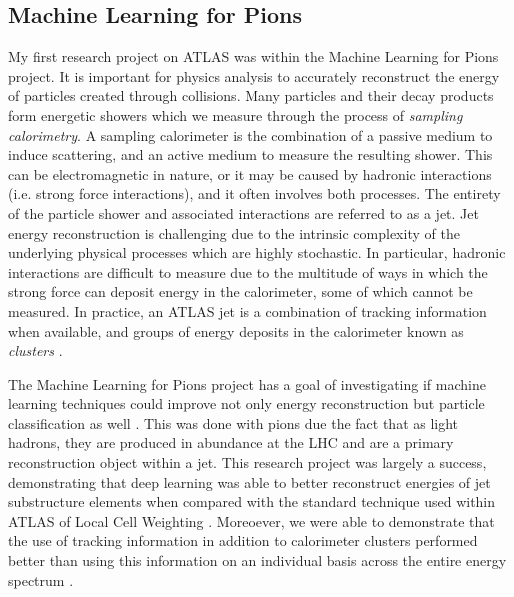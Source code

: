 \documentclass[12pt]{article}
\begin{document}
\subsection{Machine Learning for Pions}

My first research project on ATLAS was within the Machine Learning for Pions
project. It is important for physics analysis to accurately reconstruct the
energy of particles created through collisions. Many particles and their decay
products form energetic showers which we measure through the process of
\textit{sampling calorimetry}. A sampling calorimeter is the combination of a
passive medium to induce scattering, and an active medium to measure the
resulting shower. This can be electromagnetic in nature, or it may be caused
by hadronic interactions (i.e. strong force interactions), and it often
involves both processes. The entirety of the particle shower and associated
interactions are referred to as a jet. Jet energy reconstruction is challenging
due to the intrinsic complexity of the underlying physical processes which are
highly stochastic. In particular, hadronic interactions are difficult to measure
due to the multitude of ways in which the strong force can deposit energy in the
calorimeter, some of which cannot be measured. In practice, an ATLAS jet
is a combination of tracking information when available, and groups of energy
deposits in the calorimeter known as \textit{clusters} \cite{pflow_jets,
large_r_jet}. 


The Machine Learning for Pions project has a goal of investigating if machine
learning techniques could improve not only energy reconstruction but particle
classification as well \cite{ml4p_prelim}. This was done with pions due the fact
that as light hadrons, they are produced in abundance at the LHC and are a
primary reconstruction object within a jet. This research project was largely a
success, demonstrating that deep learning was able to better reconstruct
energies of jet substructure elements when compared with the standard technique
used within ATLAS of Local Cell Weighting \cite{ml4p}. Moreoever, we were able
to demonstrate that the use of tracking information in addition to calorimeter
clusters performed better than using this information on an individual basis
across the entire energy spectrum \cite{ml4p}.
\end{document}
